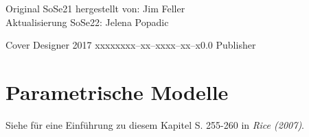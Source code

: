 \documentclass{tstextbook}
\begin{document}
       {Original SoSe21 hergestellt von: Jim Feller \\
       Aktualisierung SoSe22: Jelena Popadic}
       
       {Cover Designer}
       {2017}
       {xxxxx}{xxx--xx--xxxx--xx--x}{0.0}
       {Publisher}




\chapter{Parametrische Modelle}

\begin{book}
	Siehe für eine Einführung zu diesem Kapitel S. 255-260 in \textit{Rice (2007)}.
\end{book}
\end{document}
